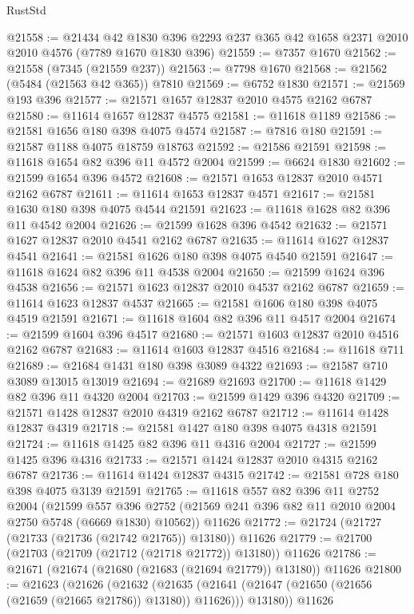 \begin{lexlean}{RustStd}
\begin{coremodule}
@21558 := @21434
    @42
    @1830
    @396
    @2293
    @237
    @365
    @42
    @1658
    @2371
    @2010
    @2010
    @4576
    (@7789 @1670 @1830 @396)
@21559 := @7357 @1670
@21562 := @21558 (@7345 (@21559 @237))
@21563 := @7798 @1670
@21568 := @21562 (@5484 (@21563 @42 @365)) @7810
@21569 := @6752 @1830
@21571 := @21569 @193 @396
@21577 := @21571 @1657 @12837 @2010 @4575 @2162 @6787
@21580 := @11614 @1657 @12837 @4575
@21581 := @11618 @1189
@21586 := @21581 @1656 @180 @398 @4075 @4574
@21587 := @7816 @180
@21591 := @21587 @1188 @4075 @18759 @18763
@21592 := @21586 @21591
@21598 := @11618 @1654 @82 @396 @11 @4572 @2004
@21599 := @6624 @1830
@21602 := @21599 @1654 @396 @4572
@21608 := @21571 @1653 @12837 @2010 @4571 @2162 @6787
@21611 := @11614 @1653 @12837 @4571
@21617 := @21581 @1630 @180 @398 @4075 @4544 @21591
@21623 := @11618 @1628 @82 @396 @11 @4542 @2004
@21626 := @21599 @1628 @396 @4542
@21632 := @21571 @1627 @12837 @2010 @4541 @2162 @6787
@21635 := @11614 @1627 @12837 @4541
@21641 := @21581 @1626 @180 @398 @4075 @4540 @21591
@21647 := @11618 @1624 @82 @396 @11 @4538 @2004
@21650 := @21599 @1624 @396 @4538
@21656 := @21571 @1623 @12837 @2010 @4537 @2162 @6787
@21659 := @11614 @1623 @12837 @4537
@21665 := @21581 @1606 @180 @398 @4075 @4519 @21591
@21671 := @11618 @1604 @82 @396 @11 @4517 @2004
@21674 := @21599 @1604 @396 @4517
@21680 := @21571 @1603 @12837 @2010 @4516 @2162 @6787
@21683 := @11614 @1603 @12837 @4516
@21684 := @11618 @711
@21689 := @21684 @1431 @180 @398 @3089 @4322
@21693 := @21587 @710 @3089 @13015 @13019
@21694 := @21689 @21693
@21700 := @11618 @1429 @82 @396 @11 @4320 @2004
@21703 := @21599 @1429 @396 @4320
@21709 := @21571 @1428 @12837 @2010 @4319 @2162 @6787
@21712 := @11614 @1428 @12837 @4319
@21718 := @21581 @1427 @180 @398 @4075 @4318 @21591
@21724 := @11618 @1425 @82 @396 @11 @4316 @2004
@21727 := @21599 @1425 @396 @4316
@21733 := @21571 @1424 @12837 @2010 @4315 @2162 @6787
@21736 := @11614 @1424 @12837 @4315
@21742 := @21581 @728 @180 @398 @4075 @3139 @21591
@21765 := @11618
    @557
    @82
    @396
    @11
    @2752
    @2004
    (@21599 @557 @396 @2752 (@21569 @241 @396 @82 @11 @2010 @2004 @2750 @5748 (@6669 @1830) @10562))
    @11626
@21772 := @21724 (@21727 (@21733 (@21736 (@21742 @21765)) @13180)) @11626
@21779 := @21700 (@21703 (@21709 (@21712 (@21718 @21772)) @13180)) @11626
@21786 := @21671 (@21674 (@21680 (@21683 (@21694 @21779)) @13180)) @11626
@21800 := @21623
    (@21626
      (@21632
        (@21635 (@21641 (@21647 (@21650 (@21656 (@21659 (@21665 @21786)) @13180)) @11626)))
        @13180))
    @11626

\end{coremodule}
\end{lexlean}
